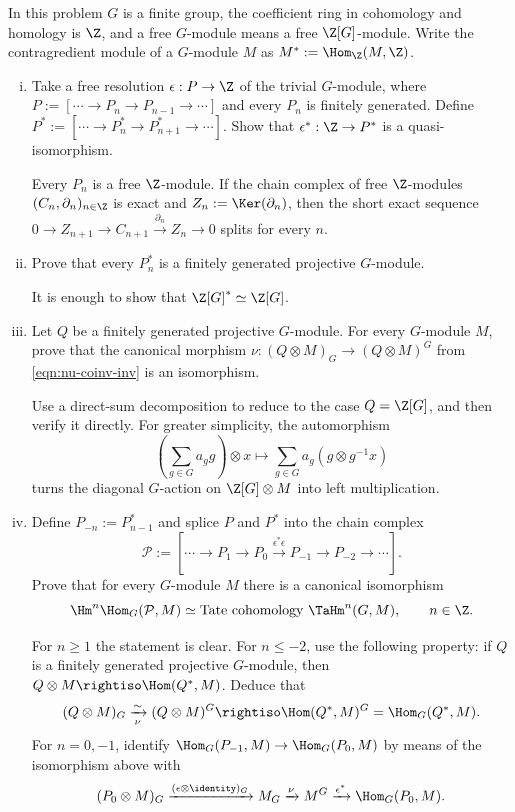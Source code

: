 \begin{Exercises}
	\item In this problem $G$ is a finite group, the coefficient ring in
	cohomology and homology is $\Z$, and a free $G$-module means a free
	$\Z[G]$-module. Write the contragredient module of a $G$-module $M$ as
	$M^*:=\Hom_{\Z}(M,\Z)$.
	\begin{enumerate}[(i)]
		\item Take a free resolution $\epsilon:P\to\Z$ of the trivial
		$G$-module, where $P:=[\cdots\to P_n\to P_{n-1}\to\cdots]$ and every
		$P_n$ is finitely generated. Define
		$P^*:=[\cdots\to P_n^*\to P_{n+1}^*\to\cdots]$. Show that
		$\epsilon^*:\Z\to P^*$ is a quasi-isomorphism.
		\begin{hint}
			Every $P_n$ is a free $\Z$-module. If the chain complex of free
			$\Z$-modules $(C_n,\partial_n)_{n\in\Z}$ is exact and
			$Z_n:=\Ker(\partial_n)$, then the short exact sequence
			$0\to Z_{n+1}\to C_{n+1}\xrightarrow{\partial_n}Z_n\to0$
			splits for every $n$.
		\end{hint}
		\item Prove that every $P_n^*$ is a finitely generated projective
		$G$-module.
		\begin{hint}
			It is enough to show that $\Z[G]^*\simeq\Z[G]$.
		\end{hint}
		\item Let $Q$ be a finitely generated projective $G$-module. For
		every $G$-module $M$, prove that the canonical morphism
		$\nu:(Q\otimes M)_G\to(Q\otimes M)^G$ from
		\eqref{eqn:nu-coinv-inv} is an isomorphism.
		\begin{hint}
			Use a direct-sum decomposition to reduce to the case $Q=\Z[G]$, and
			then verify it directly. For greater simplicity, the automorphism
			\[ \left(\sum_{g\in G}a_gg\right)\otimes x
			\mapsto\sum_{g\in G}a_g(g\otimes g^{-1}x) \]
			turns the diagonal $G$-action on $\Z[G]\otimes M$ into left
			multiplication.
		\end{hint}

		\item Define $P_{-n}:=P^*_{n-1}$ and splice $P$ and $P^*$ into the
		chain complex
		\[ \mathcal{P}:=[\cdots\to P_1\to P_0
		\xrightarrow{\epsilon^*\epsilon}P_{-1}\to P_{-2}\to\cdots]. \]
		Prove that for every $G$-module $M$ there is a canonical isomorphism
		\[ \Hm^n\Hom_G(\mathcal{P},M)
		\simeq\text{Tate cohomology }\TaHm^n(G,M),\qquad n\in\Z. \]

		\begin{hint}
			For $n\geq1$ the statement is clear. For $n\leq-2$, use the
			following property: if $Q$ is a finitely generated projective
			$G$-module, then $Q\otimes M\rightiso\Hom(Q^*,M)$. Deduce that
			\[ (Q\otimes M)_G\xrightarrow[\nu]{\sim}(Q\otimes M)^G
			\rightiso\Hom(Q^*,M)^G=\Hom_G(Q^*,M). \]
			For $n=0,-1$, identify
			$\Hom_G(P_{-1},M)\to\Hom_G(P_0,M)$ by means of the isomorphism
			above with
			\[ (P_0\otimes M)_G\xrightarrow{(\epsilon\otimes\identity)_G}M_G
			\xrightarrow{\nu}M^G\xrightarrow{\epsilon^*}\Hom_G(P_0,M). \]
		\end{hint}


\end{enumerate}
\end{Exercises}
